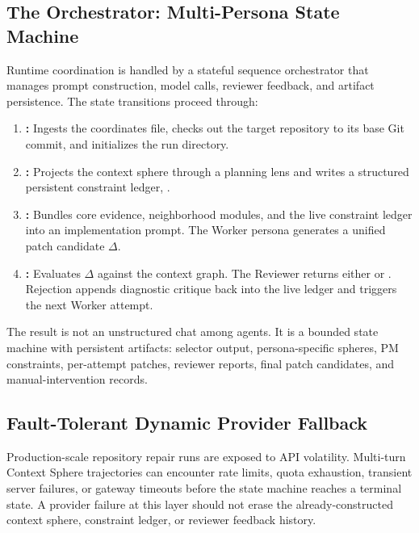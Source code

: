\subsection{The Orchestrator: Multi-Persona State Machine}

Runtime coordination is handled by a stateful sequence orchestrator that manages prompt construction, model calls, reviewer feedback, and artifact persistence. The state transitions proceed through:

\begin{enumerate}
    \item \textbf{:} Ingests the  coordinates file, checks out the target repository to its base Git commit, and initializes the run directory.
    \item \textbf{:} Projects the context sphere through a planning lens and writes a structured persistent constraint ledger, .
    \item \textbf{:} Bundles core evidence, neighborhood modules, and the live constraint ledger into an implementation prompt. The Worker persona generates a unified patch candidate \(\Delta\).
    \item \textbf{:} Evaluates \(\Delta\) against the context graph. The Reviewer returns either  or . Rejection appends diagnostic critique back into the live ledger and triggers the next Worker attempt.
\end{enumerate}

The result is not an unstructured chat among agents. It is a bounded state machine with persistent artifacts: selector output, persona-specific spheres, PM constraints, per-attempt patches, reviewer reports, final patch candidates, and manual-intervention records.

\subsection{Fault-Tolerant Dynamic Provider Fallback}

Production-scale repository repair runs are exposed to API volatility. Multi-turn Context Sphere trajectories can encounter rate limits, quota exhaustion, transient server failures, or gateway timeouts before the state machine reaches a terminal state. A provider failure at this layer should not erase the already-constructed context sphere, constraint ledger, or reviewer feedback history.


